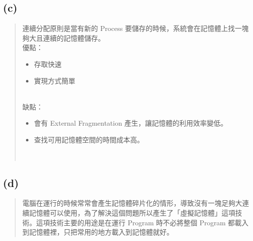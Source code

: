 \documentclass{article}
\begin{document}
\subsection*{(c)}
\begin{quote}
連續分配原則是當有新的 Process 要儲存的時候，系統會在記憶體上找一塊夠大且連續的記憶體儲存。\\
優點：
\begin{itemize}
    \item 存取快速
    \item 實現方式簡單
\end{itemize}\\
缺點：
\begin{itemize}
    \item 會有 External Fragmentation 產生，讓記憶體的利用效率變低。
    \item 查找可用記憶體空間的時間成本高。
\end{itemize}\\
\end{quote}

\subsection*{(d)}
\begin{quote}
電腦在運行的時候常常會產生記憶體碎片化的情形，導致沒有一塊足夠大連續記憶體可以使用，為了解決這個問題所以產生了「虛擬記憶體」這項技術。這項技術主要的用途是在運行 Program 時不必將整個 Program 都載入到記憶體裡，只把常用的地方載入到記憶體就好。
\end{quote}
\end{document}
